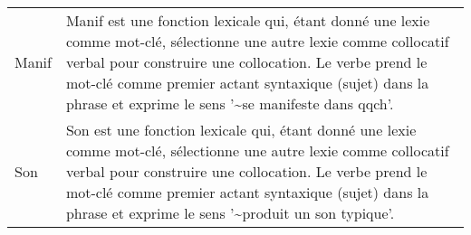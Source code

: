 \begin{longtable}{ll}
Manif & Manif est une fonction lexicale qui, étant donné une lexie comme mot-clé, sélectionne une autre lexie comme collocatif verbal pour construire une collocation. Le verbe prend le mot-clé comme premier actant syntaxique (sujet) dans la phrase et exprime le sens '\textasciitilde \space se manifeste dans qqch'. \\
Son & Son est une fonction lexicale qui, étant donné une lexie comme mot-clé, sélectionne une autre lexie comme collocatif verbal pour construire une collocation. Le verbe prend le mot-clé comme premier actant syntaxique (sujet) dans la phrase et exprime le sens '\textasciitilde \space produit un son typique'. \\
\end{longtable}

